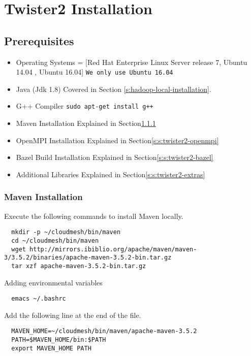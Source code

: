 \section{Twister2 Installation}\label{s:twister2-installation}

\subsection{Prerequisites}

\begin{itemize}
\item Operating Systems = [Red Hat Enterprise Linux Server release 7, Ubuntu 14.04 , Ubuntu 16.04] \verb|We only use Ubuntu 16.04|
\item Java (Jdk 1.8) Covered in Section \ref{s:hadoop-local-installation}.
\item G++ Compiler \verb|sudo apt-get install g++|
\item Maven Installation Explained in Section\ref{s:s:twister2-maven}
\item OpenMPI Installation Explained in Section\ref{s:s:twister2-openmpi}
\item Bazel Build Installation Explained in Section\ref{s:s:twister2-bazel}
\item Additional Libraries Explained in Section\ref{s:s:twister2-extras}
\end{itemize}

\subsubsection{Maven Installation}\label{s:s:twister2-maven}

Execute the following commands to install Maven locally. 

\begin{lstlisting}
  mkdir -p ~/cloudmesh/bin/maven
  cd ~/cloudmesh/bin/maven
  wget http://mirrors.ibiblio.org/apache/maven/maven-3/3.5.2/binaries/apache-maven-3.5.2-bin.tar.gz
  tar xzf apache-maven-3.5.2-bin.tar.gz  
\end{lstlisting}

Adding environmental variables

\begin{lstlisting}
  emacs ~/.bashrc  
\end{lstlisting}

Add the following line at the end of the file.

\begin{lstlisting}
  MAVEN_HOME=~/cloudmesh/bin/maven/apache-maven-3.5.2
  PATH=$MAVEN_HOME/bin:$PATH
  export MAVEN_HOME PATH
\end{lstlisting}

